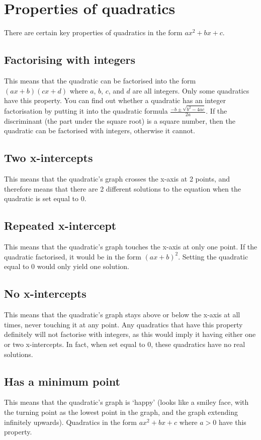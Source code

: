 \section{Properties of quadratics}
There are certain key properties of quadratics in the form $ax^2+bx+c$.

\subsection{Factorising with integers}
This means that the quadratic can be factorised into the form $(ax+b)(cx+d)$ where $a$, $b$, $c$, and $d$ are all integers. Only some quadratics have this property. You can find out whether a quadratic has an integer factorisation by putting it into the quadratic formula $\frac{-b\pm\sqrt{b^2-4ac}}{2a}$. If the discriminant (the part under the square root) is a square number, then the quadratic can be factorised with integers, otherwise it cannot.

\subsection{Two x-intercepts}
This means that the quadratic's graph crosses the x-axis at 2 points, and therefore means that there are 2 different solutions to the equation when the quadratic is set equal to 0.

\subsection{Repeated x-intercept}
This means that the quadratic's graph touches the x-axis at only one point. If the quadratic factorised, it would be in the form $(ax+b)^2$. Setting the quadratic equal to 0 would only yield one solution.

\subsection{No x-intercepts}
This means that the quadratic's graph stays above or below the x-axis at all times, never touching it at any point. Any quadratics that have this property definitely will not factorise with integers, as this would imply it having either one or two x-intercepts. In fact, when set equal to 0, these quadratics have no real solutions.

\subsection{Has a minimum point}
This means that the quadratic's graph is `happy' (looks like a smiley face, with the turning point as the lowest point in the graph, and the graph extending infinitely upwards). Quadratics in the form $ax^2+bx+c$ where $a>0$ have this property.

